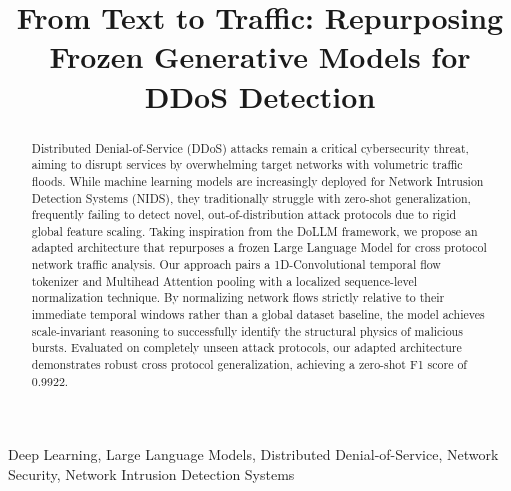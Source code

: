 \documentclass[conference]{IEEEtran}
\begin{document}
\title{From Text to Traffic: Repurposing Frozen Generative Models for DDoS Detection\\

}

\author{
\and
{}
}

\maketitle

\begin{abstract}
Distributed Denial-of-Service (DDoS) attacks remain a critical cybersecurity threat, aiming to disrupt services by overwhelming 
target networks with volumetric traffic floods. While machine learning models are increasingly deployed for Network Intrusion Detection 
Systems (NIDS), they traditionally struggle with zero-shot generalization, frequently failing to detect novel, out-of-distribution 
attack protocols due to rigid global feature scaling. Taking inspiration from the DoLLM framework, we propose an adapted architecture 
that repurposes a frozen Large Language Model for cross protocol network traffic analysis. Our approach pairs a 1D-Convolutional temporal 
flow tokenizer and Multihead Attention pooling with a localized sequence-level normalization technique. By normalizing network flows 
strictly relative to their immediate temporal windows rather than a global dataset baseline, the model achieves scale-invariant reasoning 
to successfully identify the structural physics of malicious bursts. Evaluated on completely unseen attack protocols, our adapted 
architecture demonstrates robust cross protocol generalization, achieving a zero-shot F1 score of 0.9922.
\end{abstract}

\begin{IEEEkeywords}
Deep Learning, Large Language Models, Distributed Denial-of-Service, Network Security, Network Intrusion Detection Systems
\end{IEEEkeywords}
\end{document}
